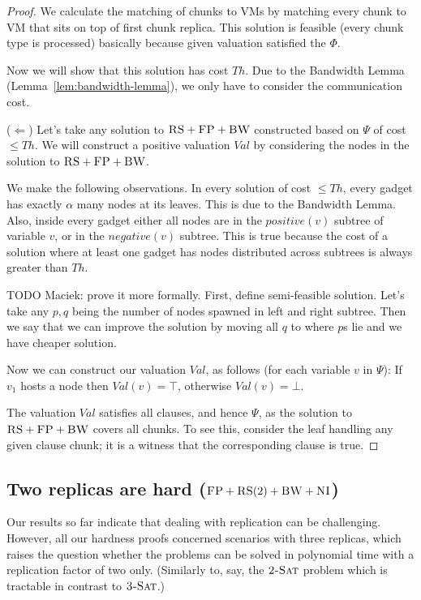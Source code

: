 \documentclass[9pt,twocolumn]{scrartcl}
\newcommand{\clauses}{\alpha}
\newcommand{\CC}{\textsc{NI}}
\newcommand{\FP}{\textsc{FP}}
\newcommand{\RS}{\textsc{RS}}
\newcommand{\BW}{\textsc{BW}}
\newcommand{\TSAT}{\textsc{3-Sat}}
\newcommand{\ZSAT}{\textsc{2-Sat}}
\newcommand{\Formula}{\ensuremath{\Psi}}
\newcommand{\Thr}{\ensuremath{Th}}
\newcommand{\positive}{\ensuremath{positive}}
\newcommand{\negative}{\ensuremath{negative}}
\newcommand{\Val}{\ensuremath{Val}}
\begin{document}
\begin{appendix}
\begin{proof}
We calculate the matching of chunks to VMs by matching every chunk to
VM that sits on top of first chunk replica. This solution is feasible
(every chunk type is processed) basically
because given valuation satisfied the $\Phi$.

Now we will show that this solution has cost $\Thr$.
Due to the Bandwidth Lemma (Lemma~\ref{lem:bandwidth-lemma}),
we only have to consider the communication cost.

($\Leftarrow$) Let's take any solution to $\RS+\FP+\BW$ constructed based on $\Formula$ of cost $\leq \Thr$.
We will construct a positive valuation $\Val$ by considering the nodes in
the solution to $\RS+\FP+\BW$.

We make the following observations. In every solution of cost
$\leq \Thr$, every gadget has exactly $\clauses$ many nodes
at its leaves. This is due to the Bandwidth Lemma. Also, inside
every gadget either all nodes are in the $\positive(v)$ subtree
of variable $v$, or in the $\negative(v)$ subtree. This is true
because the cost of a solution where at least one gadget has nodes
distributed across subtrees is
always greater than $\Thr$.

TODO Maciek: prove it more formally. First, define semi-feasible solution. Let's take any $p,q$ being the number of nodes
spawned in left and right subtree. Then we say that we can improve the
solution by moving all $q$ to where $p$s lie and we have cheaper solution.

Now we can construct our valuation $\Val$, as follows
(for each variable $v$ in $\Formula$):
If $v_1$ hosts a node then $\Val(v) = \top$,
otherwise $\Val(v) = \bot$.

The valuation $\Val$ satisfies all clauses, and hence $\Formula$,
as the solution to $\RS+\FP+\BW$ covers all chunks. To see this,
consider the leaf handling any given clause chunk;
it is a witness that the corresponding clause is true.
\end{proof}

\subsection{Two replicas are hard ($\FP+\RS(2)+\BW+\CC$)}\label{ssec:two}

Our results so far indicate that dealing with replication can be challenging.
However, all our hardness proofs concerned scenarios with three replicas,
which raises the question whether the problems can be solved in polynomial time
with a replication factor of two only. (Similarly to, say, the $\ZSAT$ problem
which is tractable in contrast to $\TSAT$.)


\end{appendix}
\end{document}
